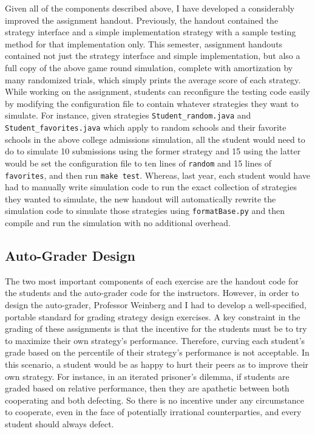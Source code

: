 \documentclass[pageno]{jpaper}
\begin{document}
Given all of the components described above, I have developed a considerably improved the assignment handout.
Previously, the handout contained the strategy interface and a simple implementation strategy with a sample testing method for that implementation only.
This semester, assignment handouts contained not just the strategy interface and simple implementation, but also a full copy of the above game round simulation, complete with amortization by many randomized trials, which simply prints the average score of each strategy.
While working on the assignment, students can reconfigure the testing code easily by modifying the configuration file to contain whatever strategies they want to simulate.
For instance, given strategies \texttt{Student\_random.java} and \texttt{Student\_favorites.java} which apply to random schools and their favorite schools in the above college admissions simulation, all the student would need to do to simulate 10 submissions using the former strategy and 15 using the latter would be set the configuration file to ten lines of \texttt{random} and 15 lines of \texttt{favorites}, and then run \texttt{make test}.
Whereas, last year, each student would have had to manually write simulation code to run the exact collection of strategies they wanted to simulate, the new handout will automatically rewrite the simulation code to simulate those strategies using \texttt{formatBase.py} and then compile and run the simulation with no additional overhead.

\subsection*{Auto-Grader Design}
The two most important components of each exercise are the handout code for the students and the auto-grader code for the instructors.
However, in order to design the auto-grader, Professor Weinberg and I had to develop a well-specified, portable standard for grading strategy design exercises.
A key constraint in the grading of these assignments is that the incentive for the students must be to try to maximize their own strategy's performance.
Therefore, curving each student's grade based on the percentile of their strategy's performance is not acceptable.
In this scenario, a student would be as happy to hurt their peers as to improve their own strategy.
For instance, in an iterated prisoner's dilemma, if students are graded based on relative performance, then they are apathetic between both cooperating and both defecting.
So there is no incentive under any circumstance to cooperate, even in the face of potentially irrational counterparties, and every student should always defect.
\end{document}
